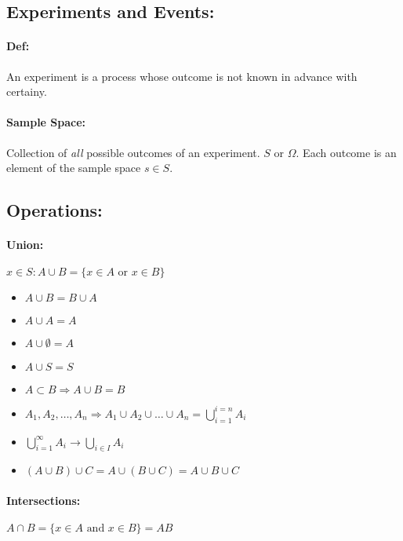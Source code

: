 \documentclass{article}
\begin{document}
    \subsection*{Experiments and Events:}
        \paragraph*{Def:} An experiment is a process whose outcome is not known in advance with certainy.
        \paragraph*{Sample Space: } Collection of \textit{all} possible outcomes of an experiment. $S$ or $\Omega$. Each outcome is an element of the sample space $s \in S$.
    \subsection*{Operations: }
        \paragraph*{Union: } \( x \in S: A \cup B = \{x \in A \text{ or } x \in B\}\)
            \begin{itemize}
                \item[] \(A \cup B = B \cup A \)
                \item[] \(A \cup A = A \)
                \item[] \(A \cup \emptyset = A \)
                \item[] \(A \cup S = S \)
                \item[] \(A \subset B \Rightarrow A \cup B = B\)
                \item[] \(A_1, A_2, \dots, A_n \Rightarrow A_1 \cup A_2 \cup \dots \cup A_n = \bigcup\limits_{i=1}^{i=n} A_i\)
                \item[] \(\bigcup\limits_{i=1}^{\infty} A_i \rightarrow \bigcup\limits_{i\in I}A_i \)
                \item[] \( (A \cup B) \cup C = A \cup (B \cup C) = A \cup B \cup C \)
            \end{itemize}
        \paragraph*{Intersections: } \( A \cap B = \{ x \in A \text{ and } x \in B\} = AB \)            

            
\end{document}
